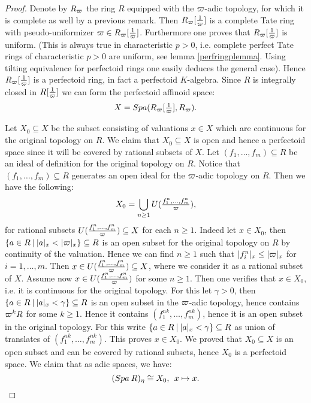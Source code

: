 \begin{proof}
Denote by $R_{\varpi}$ the ring $R$ equipped with the $\varpi$-adic topology, for which it is complete as well by a previous remark.
Then $R_{\varpi}[\tfrac{1}{\varpi}]$ is a complete Tate ring with pseudo-uniformizer $\varpi\in R_{\varpi}[\tfrac{1}{\varpi}]$.
Furthermore one proves that $R_{\varpi}[\tfrac{1}{\varpi}]$ is uniform. (This is always true in characteristic $p>0$, i.e. complete perfect Tate rings of characteristic $p>0$ are uniform, see lemma \ref{perfringplemma}. Using tilting equivalence for perfectoid rings one easily deduces the general case). 
Hence $R_{\varpi}[\tfrac{1}{\varpi}]$ is a perfectoid ring, in fact a perfectoid $K$-algebra.
Since $R$ is integrally closed in $R[\tfrac{1}{\varpi}]$ we can form the perfectoid affinoid space:
\[X = {Spa({R_{\varpi}[\tfrac{1}{\varpi}]},{R_{\varpi}})}.\]

Let $X_0\subseteq X$ be the subset consisting of valuations $x\in X$ which are continuous for the original topology on $R$.
We claim that $X_0\subseteq X$ is open and hence a perfectoid space since it will be covered by rational subsets of $X$.
Let $(f_1,\dots,f_m)\subseteq R$ be an ideal of definition for the original topology on $R$. Notice that $(f_1,\dots,f_m)\subseteq R$ generates an open ideal for the $\varpi$-adic topology on $R$.
Then we have the following:
\[X_0 =  \bigcup\limits_{n\geq1}U(\tfrac{f_1^n,\dots,f_m^n}{\varpi}),\]
for rational subsets $U(\tfrac{f_1^n,\dots,f_m^n}{\varpi})\subseteq X$ for each $n\geq 1$.
Indeed let $x\in X_0$, then $\{a\in R\:\vert\: \lvert a\rvert_{x}<\lvert\varpi\rvert_{x}\}\subseteq R$ is an open subset for the original topology on $R$ by continuity of the valuation.
Hence we can find $n\geq1$ such that $\lvert f_i^n\rvert_{x}\leq\lvert\varpi\rvert_{x}$ for $i=1,\dots,m$. 
Then $x\in U(\tfrac{f_1^n,\dots,f_m^n}{\varpi})\subseteq X$, where we consider it as a rational subset of $X$. 
Assume now $x\in U(\tfrac{f_1^n,\dots,f_m^n}{\varpi})$ for some $n\geq 1$. 
Then one verifies that $x\in X_0$, i.e. it is continuous for the original topology.
For this let $\gamma>0$, then  $\{a\in R\:\vert\: \lvert a\rvert_{x}<\gamma\}\subseteq R$ is an open subset in the $\varpi$-adic topology, hence 
contains $\varpi^kR$ for some $k\geq1$. Hence it contains $(f_1^{nk},\dots,f_m^{nk})$, hence it is an open subset in the original topology. For this write $\{a\in R\:\vert\: \lvert a\rvert_{x}<\gamma\}\subseteq R$ as union of translates of
$(f_1^{nk},\dots,f_m^{nk})$.
This proves $x\in X_0$.
We proved that $X_0\subseteq X$ is an open subset and can be covered by rational subsets, hence $X_0$ is a perfectoid space.
We claim that as adic spaces, we have:
\[({Spa{\:R}})_{\eta}\cong X_0,\:\: x\mapsto x.\]


\end{proof}
